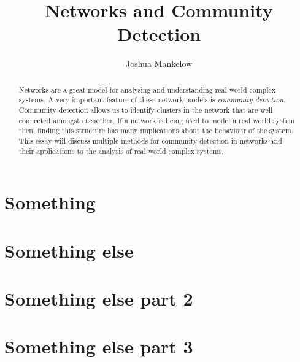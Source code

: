 \documentclass[a4paper]{article}
\title{Networks and Community Detection}
\author{Joshua Mankelow}
\begin{document}
\maketitle

\begin{abstract}
    Networks are a great model for analysing and understanding real world complex systems. A very important feature of these network models is \emph{community detection}. Community detection allows us to identify clusters in the network that are well connected amongst eachother. If a network is being used to model a real world system then, finding this structure has many implications about the behaviour of the system. This essay will discuss multiple methods for community detection in networks and their applications to the analysis of real world complex systems.\cite{greenwade93}
\end{abstract}

\newpage

\tableofcontents

\newpage

\section{Something}

\newpage

\section{Something else}

\newpage

\section{Something else part 2}

\newpage

\section{Something else part 3}

\newpage



\end{document}
